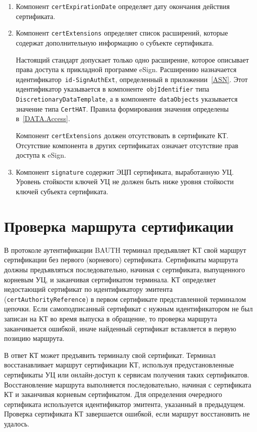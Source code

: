 \begin{enumerate}
\item
Компонент \verb|certExpirationDate| определяет дату окончания действия 
сертификата.

\item
Компонент \verb|certExtensions| определяет список расширений, 
которые содержат дополнительную информацию о субъекте сертификата. 

Настоящий стандарт допускает только одно расширение, которое описывает 
права доступа к прикладной программе eSign. 
Расширению назначается идентификатор~\verb|id-SignAuthExt|,
определенный в приложении~\ref{ASN}. Этот идентификатор указывается
в компоненте~\texttt{objIdentifier} типа \texttt{DiscretionaryDataTemplate},
а в компоненте~\texttt{dataObjects} указывается значение типа \verb|CertHAT|.
Правила формирования значения определены в~\ref{DATA.Access}. 

Компонент \verb|certExtensions| должен отсутствовать в сертификате КТ.
%
Отсутствие компонента в других сертификатах означает отсутствие прав доступа к 
eSign. 

\item
Компонент \verb|signature| содержит ЭЦП сертификата, выработанную УЦ.
Уровень стойкости ключей УЦ не должен быть ниже уровня стойкости 
ключей субъекта сертификата.
\end{enumerate}

\section{Проверка маршрута сертификации}\label{CERTS.Path}

В протоколе аутентификации BAUTH терминал предъявляет КТ свой маршрут сертификации 
без первого (корневого) сертификата. 
%
Сертификаты маршрута должны предъявляться последовательно, начиная с сертификата,
выпущенного корневым УЦ, и заканчивая сертификатом терминала.
%
КТ определяет недостающий сертификат по идентификатору эмитента 
(\texttt{certAuthorityReference}) в первом сертификате представленной 
терминалом цепочки. 
%
Если самоподписанный сертификат с нужным идентификатором не был записан 
на КТ во время выпуска в обращение, то проверка маршрута заканчивается
ошибкой, иначе найденный сертификат вставляется в первую позицию маршрута.

В ответ КТ может предъявить терминалу свой сертификат.
%
Терминал восстанавливает маршрут сертификации КТ, используя предустановленные 
сертификаты УЦ или онлайн-доступ к сервисам получения таких сертификатов.
%
Восстановление маршрута выполняется последовательно, начиная с сертификата КТ и
заканчивая корневым сертификатом. Для определения очередного сертификата
используется идентификатор эмитента, указанный в предыдущем. Проверка
сертификата КТ завершается ошибкой, если маршрут восстановить не удалось.

